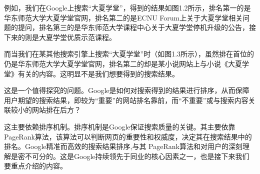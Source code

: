 \documentclass[UTF8,openany]{ctexbook}
\begin{document}
例如，我们在Google上搜索“大夏学堂”，得到的结果如图1.2所示，排名第一的是华东师范大学大夏学堂官网，排名第二的是ECNU Forum上关于大夏学堂相关问题的提问，排名第三的是华东师范大学课程中心关于大夏学堂停机升级的公告，接下来的则是大夏学堂优质示范课程。

而当我们在某其他搜索引擎上搜索“大夏学堂”时（如图1.3所示），虽然排在首位的仍是华东师范大学大夏学堂官网，排名第二的却是某小说网站上与小说《大夏学堂》有关的内容。这明显不是我们想要得到的搜索结果。

这是一个值得探究的问题。Google是如何对搜索得到的结果进行排序，从而保障用户期望的搜索结果，即较为“重要”的网站排名靠前，而“不重要”或与搜索内容关联较小的网站排在后方？

这主要依赖排序机制。排序机制是Google保证搜索质量的关键。其主要依靠PageRank算法，该算法可以判断网页的重要性和权威度，决定其在搜索结果中的排名。Google精准而高效的搜索结果排序,与其 PageRank算法和对用户的深刻理解是密不可分的。这是Google持续领先于同业的核心因素之一，也是接下来我们要重点介绍的内容。
\end{document}
